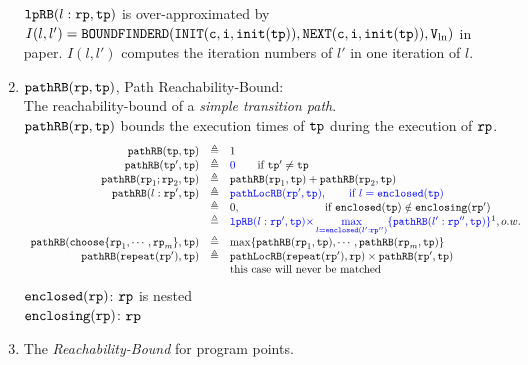 \begin{enumerate}
      $\mathtt{lpRB}(l:\mathtt{rp}, \mathtt{tp})$ is over-approximated by
      $I(l, l') = \mathtt{BOUNDFINDERD(INIT(c, i, \mathtt{init}(\mathtt{tp})), NEXT(c, i, \mathtt{init}(\mathtt{tp})), V_{\ln})}$ in paper\cite{GulwaniJK09}.
      $I(l, l')$ computes the iteration numbers of $l'$ in one iteration of $l$.
      \item $\mathtt{pathRB}(\mathtt{rp}, \mathtt{tp}) $, Path Reachability-Bound:  
      \\
      The reachability-bound of a \emph{simple transition path}.
      \\
      $\mathtt{pathRB}(\mathtt{rp}, \mathtt{tp}) $ bounds the execution times of $\mathtt{tp}$ during the execution of $\mathtt{rp}$.
      \[
        \begin{array}{rcl}
          \inoutB(\tpath, \tpath) & \triangleq & 1  \\
          \inoutB(\tpath', \tpath) & \triangleq & \highlight{0} \qquad \text{if } \tpath' \neq \tpath\\
          \inoutB(\rprog_1;\rprog_2, \tpath) & \triangleq & \inoutB(\rprog_1, \tpath) + \inoutB(\rprog_2, \tpath) \\
          \inoutB(l: \rprog', \tpath) & \triangleq & 
          \highlight{\outinB(\rprog', \tpath), \qquad \text{if } l = \kw{enclosed}(\tpath)}
          \\
          &  \triangleq & 
         0, \qquad \qquad \qquad \quad ~~ \text{if }  \kw{enclosed}(\tpath) \notin \kw{enclosing}(\rprog')
          \\
          &  \triangleq & 
          \highlight{
            \lpchB(l:\rprog', \tpath ) }
          \highlight{\times \max\limits_{l = \kw{enclosed}(l':\rprog'')}
         \{\inoutB(l':\rprog'', \tpath)\} } \footnotemark, o.w. \\
          \inoutB(\rpchoose{\rprog_1, \cdots, \rprog_m }, \tpath) & \triangleq 
          & \max\left\{ \inoutB(\rprog_1, \tpath), \cdots, \inoutB(\rprog_m, \tpath) \right\} 
          \\
          \inoutB(\rprepeat(\rprog'), \tpath) & \triangleq & \outinB(\rprepeat(\rprog'), \rprog) \times \inoutB(\rprog', \tpath)\\
          &  & \text{this case will never be matched}
          \end{array}
        \]
        $\mathtt{enclosed}(\mathtt{rp})$:  $\mathtt{rp}$ is nested
        \\
        $\mathtt{enclosing}(\mathtt{rp})$:  $\mathtt{rp}$
      \item The \emph{Reachability-Bound} for program points.
    

\end{enumerate}
